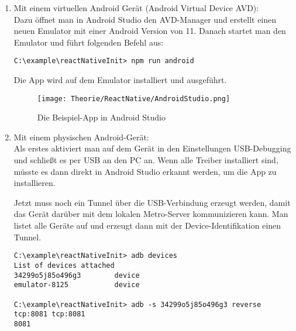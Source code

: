 \begin{enumerate}
  \item Mit einem virtuellen Android Gerät (Android Virtual Device AVD):\\
Dazu öffnet man in Android Studio den AVD-Manager und erstellt einen neuen Emulator mit einer
Android Version von 11. Danach startet man den Emulator und führt folgenden Befehl aus:

\begin{lstlisting}
C:\example\reactNativeInit> npm run android
\end{lstlisting}

Die App wird auf dem Emulator installiert und ausgeführt.

\begin{figure}[H]
  \begin{center}
    \texttt{[image: Theorie/ReactNative/AndroidStudio.png]}
    \caption{Die Beispiel-App in Android Studio}
  \end{center}
\end{figure}

  \item Mit einem physischen Android-Gerät:\\
Als erstes aktiviert man auf dem Gerät in den Einstellungen USB-Debugging und schließt es per USB an
den PC an. Wenn alle Treiber installiert sind, müsste es dann direkt in Android Studio erkannt
werden, um die App zu installieren.

Jetzt muss noch ein Tunnel über die USB-Verbindung erzeugt werden, damit das Gerät darüber mit dem
lokalen Metro-Server kommunizieren kann. Man listet alle Geräte auf und erzeugt dann mit der
Device-Identifikation einen Tunnel.

\begin{lstlisting}
C:\example\reactNativeInit> adb devices
List of devices attached
34299o5j85o496g3        device
emulator-8125           device

C:\example\reactNativeInit> adb -s 34299o5j85o496g3 reverse tcp:8081 tcp:8081
8081
\end{lstlisting}

\end{enumerate}